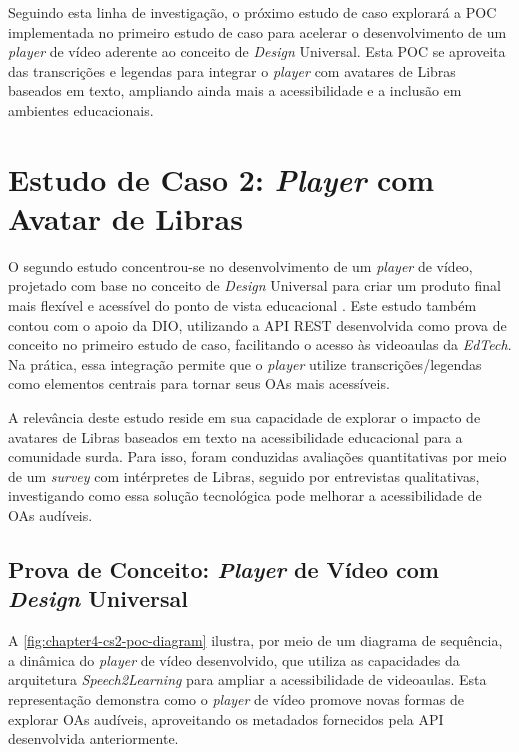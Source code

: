 Seguindo esta linha de investigação, o próximo estudo de caso explorará a POC implementada no primeiro estudo de caso para acelerar o desenvolvimento de um \textit{player} de vídeo aderente ao conceito de \textit{Design} Universal. Esta POC se aproveita das transcrições e legendas para integrar o \textit{player} com avatares de Libras baseados em texto, ampliando ainda mais a acessibilidade e a inclusão em ambientes educacionais.

\section{Estudo de Caso 2: \textit{Player} com Avatar de Libras}

O segundo estudo concentrou-se no desenvolvimento de um \textit{player} de vídeo, projetado com base no conceito de \textit{Design} Universal para criar um produto final mais flexível e acessível do ponto de vista educacional \cite{UNESCO2023, GovBr2023}. Este estudo também contou com o apoio da DIO, utilizando a API REST desenvolvida como prova de conceito no primeiro estudo de caso, facilitando o acesso às videoaulas da \textit{EdTech}. Na prática, essa integração permite que o \textit{player} utilize transcrições/legendas como elementos centrais para tornar seus OAs mais acessíveis.

A relevância deste estudo reside em sua capacidade de explorar o impacto de avatares de Libras baseados em texto na acessibilidade educacional para a comunidade surda. Para isso, foram conduzidas avaliações quantitativas por meio de um \textit{survey} com intérpretes de Libras, seguido por entrevistas qualitativas, investigando como essa solução tecnológica pode melhorar a acessibilidade de OAs audíveis.

\subsection{Prova de Conceito: \textit{Player} de Vídeo com \textit{Design} Universal}

A \autoref{fig:chapter4-cs2-poc-diagram} ilustra, por meio de um diagrama de sequência, a dinâmica do \textit{player} de vídeo desenvolvido, que utiliza as capacidades da arquitetura \textit{Speech2Learning} para ampliar a acessibilidade de videoaulas. Esta representação demonstra como o \textit{player} de vídeo promove novas formas de explorar OAs audíveis, aproveitando os metadados fornecidos pela API desenvolvida anteriormente.

